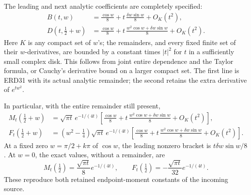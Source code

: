 \documentclass[
  10pt,
  a4paper,
]{article}
\begin{document}
The leading and next analytic coefficients are completely specified: \[
 \begin{aligned}
 B(t,w)
   &=\frac{\cos w}{8}
        +t\,\frac{\delta w\sin w}{8}+O_K(t^2),\\
 D(t,\tfrac12+w)
   &=\frac{\cos w}{8}
        +t\,\frac{w^2\cos w+\delta w\sin w}{8}+O_K(t^2).
 \end{aligned}
 \tag{ERD46}
\] Here \(K\) is any compact set of \(w\)'s; the remainders, and every
fixed finite set of their \(w\)-derivatives, are bounded by a constant
times \(|t|^2\) for \(t\) in a sufficiently small complex disk. This
follows from joint entire dependence and the Taylor formula, or Cauchy's
derivative bound on a larger compact set. The first line is ERD31 with
its actual analytic remainder; the second retains the extra derivative
of \(e^{tw^2}\).

In particular, with the entire remainder still present, \[
 \begin{aligned}
 M_t(\tfrac12+w)
   &=\sqrt{\pi t}\,e^{-1/(4t)}
       \left[
          \frac{\cos w}{8}
          +t\,\frac{w^2\cos w+\delta w\sin w}{8}
          +O_K(t^2)\right],\\
 F_t(\tfrac12+w)
   &=(w^2-\tfrac14)\sqrt{\pi t}\,e^{-1/(4t)}
       \left[
          \frac{\cos w}{8}
          +t\,\frac{w^2\cos w+\delta w\sin w}{8}
          +O_K(t^2)\right].
 \end{aligned}
 \tag{ERD47}
\] At a fixed zero \(w=\pi/2+k\pi\) of \(\cos w\), the leading nonzero
bracket is \(t\delta w\sin w/8\). At \(w=0\), the exact values, without
a remainder, are \[
 M_t(\tfrac12)=\frac{\sqrt{\pi t}}8 e^{-1/(4t)},\qquad
 F_t(\tfrac12)=-\frac{\sqrt{\pi t}}{32}e^{-1/(4t)}.
 \tag{ERD48}
\] These reproduce both retained endpoint-moment constants of the
incoming source.
\end{document}
